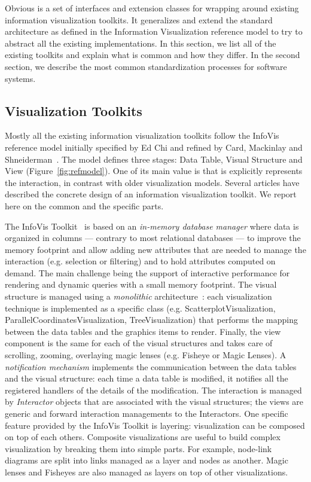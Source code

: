 Obvious is a set of interfaces and extension classes for wrapping
around existing information visualization toolkits.  It generalizes
and extend the standard architecture as defined in the Information
Visualization reference model to try to abstract all the existing
implementations.  In this section, we list all of the existing
toolkits and explain what is common and how they differ.  In the
second section, we describe the most common standardization processes
for software systems.

\subsection{Visualization Toolkits}

Mostly all the existing information visualization toolkits follow the
InfoVis reference model initially specified by Ed Chi and refined by
Card, Mackinlay and Shneiderman~\cite{ChiRefModel,ReadingsIV}.  The
model defines three stages: Data Table, Visual Structure and View
(Figure~\ref{fig:refmodel}).  One of its main value is that is
explicitly represents the interaction, in contrast with older
visualization models.
Several articles have described the concrete design of an information
visualization toolkit.  We report here on the common and the
specific parts.

The InfoVis Toolkit~\cite{InfoVis} is based on an \emph{in-memory
  database manager} where data is organized in columns --- contrary to
most relational databases --- to improve the memory footprint and
allow adding new attributes that are needed to manage the interaction
(e.g. selection or filtering) and to hold attributes computed on
demand.  The main challenge being the support of interactive
performance for rendering and dynamic queries with a small memory
footprint.  The visual structure is managed using a \emph{monolithic}
architecture~\cite{Polylithic}: each visualization technique is
implemented as a specific class (e.g. ScatterplotVisualization,
ParallelCoordinatesVisualization, TreeVisualization) that performs the
mapping between the data tables and the graphics items to render.
Finally, the view component is the same for each of the visual
structures and takes care of scrolling, zooming, overlaying magic
lenses (e.g. Fisheye or Magic Lenses). A \emph{notification mechanism}
implements the communication between the data tables and the visual
structure: each time a data table is modified, it notifies all the
registered handlers of the details of the modification. The
interaction is managed by \emph{Interactor} objects that are
associated with the visual structures; the views are generic and
forward interaction managements to the Interactors.  One specific
feature provided by the InfoVis Toolkit is layering: visualization can
be composed on top of each others.  Composite visualizations are
useful to build complex visualization by breaking them into simple
parts. For example, node-link diagrams are split into links managed as
a layer and nodes as another.  Magic lenses and Fisheyes are also
managed as layers on top of other visualizations.

